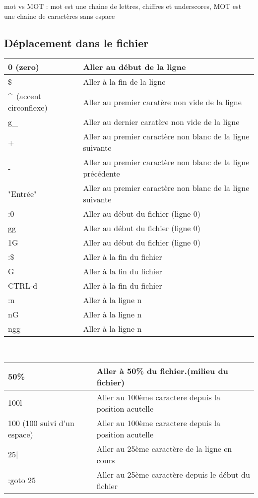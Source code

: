 \documentclass{article}
\begin{document}
mot vs MOT : mot est une chaine de lettres, chiffres et underscores, MOT est une chaine de caractères sans espace\\

\subsection{Déplacement dans le fichier}
\begin{tabular}{|p{3cm}| l| }
\hline
0 (zero) & Aller au début de la ligne \\ \hline
\$ & Aller à la fin de la ligne \\ \hline
\^~(accent circonflexe) & Aller au premier caratère non vide de la ligne \\ \hline
g\_ & Aller au dernier caratère non vide de la ligne \\ \hline
+ & Aller au premier caractère non blanc de la ligne suivante \\ \hline
- & Aller au premier caractère non blanc de la ligne précédente \\ \hline
"Entrée" & Aller au premier caractère non blanc de la ligne suivante\\ \hline
:0 & Aller au début du fichier (ligne 0) \\ \hline
gg & Aller au début du fichier (ligne 0) \\ \hline
1G & Aller au début du fichier (ligne 0) \\ \hline
:\$ & Aller à la fin du fichier\\ \hline
G & Aller à la fin du fichier\\ \hline
CTRL-d & Aller à la fin du fichier\\ \hline
:n & Aller à la ligne n\\ \hline
nG & Aller à la ligne n\\ \hline
ngg & Aller à la ligne n\\ \hline
\end{tabular}\\[0.5cm]



\begin{tabular}{|p{3cm}| l| }
\hline
  50\% & Aller à 50\% du fichier.(milieu du fichier) \\ \hline
  100l & Aller au 100ème caractere depuis la position acutelle \\ \hline
  100 (100 suivi d'un espace) & Aller au 100ème caractere depuis la position acutelle \\ \hline
  25| & Aller au 25ème caractère de la ligne en cours\\ \hline
  :goto 25 & Aller au 25ème caractère depuis le début du fichier\\ \hline
\end{tabular}\\
\end{document}
